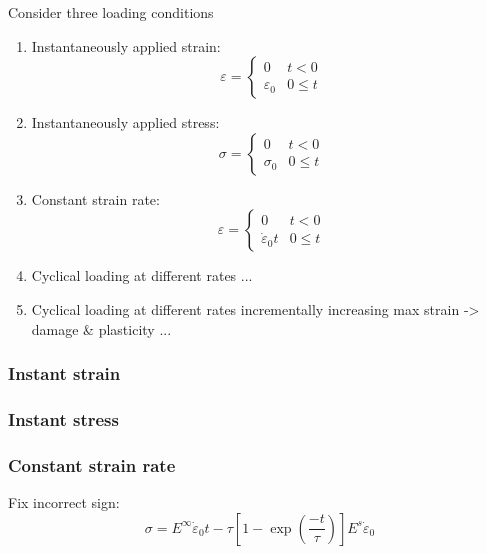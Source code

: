 \documentclass[12pt]{article}
\begin{document}
Consider three loading conditions
\begin{enumerate}
	\item Instantaneously applied strain:
	\begin{equation}
		\varepsilon = \begin{cases}
			0& t<0\\
			\varepsilon_{0} & 0 \leq t
		\end{cases}
	\end{equation}
	\item Instantaneously applied stress:
	\begin{equation}
		\sigma = \begin{cases}
			0& t<0\\
			\sigma_{0} & 0 \leq t
		\end{cases}
	\end{equation}
	\item Constant strain rate:\begin{equation}
		\varepsilon = \begin{cases}
			0& t<0\\
			\dot{\varepsilon}_{0}t & 0 \leq t
		\end{cases}
	\end{equation}	

	\item Cyclical loading at different rates ...
	
	\item Cyclical loading at different rates incrementally increasing max strain -> damage \& plasticity ...
	
\end{enumerate}

\subsubsection*{Instant strain}
\subsubsection*{Instant stress}
\subsubsection*{Constant strain rate}

Fix incorrect sign:
\begin{equation}
	\sigma = E^{\infty}\dot{\varepsilon}_{0}t - \tau \left[1-\exp\left(\dfrac{-t}{\tau}\right)\right]E^{s}\dot{\varepsilon}_{0} 
\end{equation}
\end{document}
